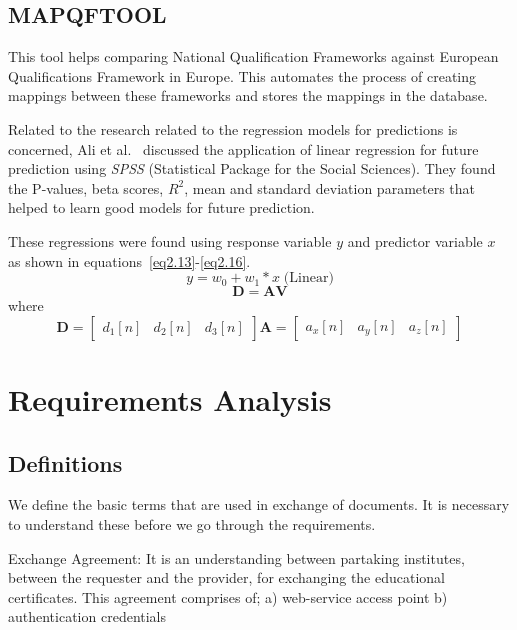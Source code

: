 \documentclass[12pt,a4paper,oneside]{book}
\begin{document}
\section{MAPQFTOOL}
This tool helps comparing National Qualification Frameworks against European Qualifications Framework in Europe. This automates the process of creating mappings between these frameworks and stores the mappings in the database.

Related to the \cite{umair} research related to the regression models for predictions is concerned, Ali et al.~\cite{ali} discussed the application of linear regression for future prediction using {\it SPSS} (Statistical Package for the Social Sciences). They found the P-values, beta scores, $R^2$, mean and standard deviation parameters that helped to learn good models for future prediction.

These regressions were found using response variable $y$ and predictor variable $x$ as shown in equations~\ref{eq2.13}-\ref{eq2.16}.
%
\begin{equation}
  y  =  w_0 + w_1 * x \; \mbox{(Linear)}
  \label{eq2.13}
\end{equation}
%
\begin{equation}
\mathbf{D} = \mathbf{A} \mathbf{V}
\label{eq:Coord_Transformation}
\end{equation}
%
where
%
\begin{equation}
\mathbf{D} = \left[\begin{array}{ccc}d_1[n] & d_2[n] & d_3[n] \end{array}\right]
\mathbf{A} = \left[  \begin{array}{ccc}a_x[n] & a_y[n] & a_z[n]\end{array} \right]
\end{equation}

\chapter{Requirements Analysis}\label{ch-requirements-analysis}
\section{Definitions}
We define the basic terms that are used in exchange of documents. It is necessary to understand these before we go through the requirements.

Exchange Agreement: It is an understanding between partaking institutes, between the requester and the provider, for exchanging the educational certificates. This agreement comprises of;
 a) web-service access point
 b) authentication credentials
\end{document}
